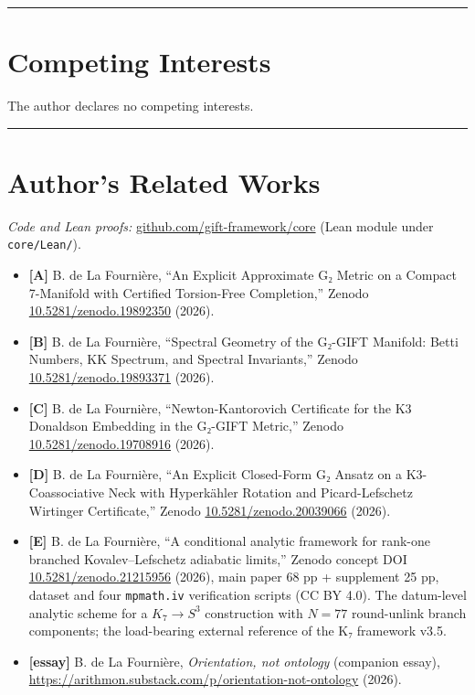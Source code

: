 \documentclass[11pt,a4paper]{article}
\begin{document}
\begin{center}\rule{\linewidth}{0.5pt}\end{center}

\section{Competing Interests}\label{competing-interests}

The author declares no competing interests.

\begin{center}\rule{\linewidth}{0.5pt}\end{center}

\section{Author's Related Works}\label{authors-related-works}

\emph{Code and Lean proofs:} \href{https://github.com/gift-framework/core}{github.com/gift-framework/core} (Lean module under \texttt{core/\allowbreak{}Lean/\allowbreak{}}).

\begin{itemize}
\tightlist
\item
  \textbf{{[}A{]}} B. de La Fournière, ``An Explicit Approximate G₂ Metric on a Compact 7-Manifold with Certified Torsion-Free Completion,'' Zenodo \href{https://doi.org/10.5281/zenodo.19892350}{10.5281/zenodo.19892350} (2026).
\item
  \textbf{{[}B{]}} B. de La Fournière, ``Spectral Geometry of the G₂-GIFT Manifold: Betti Numbers, KK Spectrum, and Spectral Invariants,'' Zenodo \href{https://doi.org/10.5281/zenodo.19893371}{10.5281/zenodo.19893371} (2026).
\item
  \textbf{{[}C{]}} B. de La Fournière, ``Newton-Kantorovich Certificate for the K3 Donaldson Embedding in the G₂-GIFT Metric,'' Zenodo \href{https://doi.org/10.5281/zenodo.19708916}{10.5281/zenodo.19708916} (2026).
\item
  \textbf{{[}D{]}} B. de La Fournière, ``An Explicit Closed-Form G₂ Ansatz on a K3-Coassociative Neck with Hyperkähler Rotation and Picard-Lefschetz Wirtinger Certificate,'' Zenodo \href{https://doi.org/10.5281/zenodo.20039066}{10.5281/zenodo.20039066} (2026).
\item
  \textbf{{[}E{]}} B. de La Fournière, ``A conditional analytic framework for rank-one branched Kovalev--Lefschetz adiabatic limits,'' Zenodo concept DOI \href{https://doi.org/10.5281/zenodo.21215956}{10.5281/zenodo.21215956} (2026), main paper 68 pp + supplement 25 pp, dataset and four \texttt{mpmath.\allowbreak{}iv} verification scripts (CC BY 4.0). The datum-level analytic scheme for a \(K_7 \to S^3\) construction with \(N = 77\) round-unlink branch components; the load-bearing external reference of the K₇ framework v3.5.
\item
  \textbf{{[}essay{]}} B. de La Fournière, \emph{Orientation, not ontology} (companion essay), \url{https://arithmon.substack.com/p/orientation-not-ontology} (2026).
\end{itemize}
\end{document}
